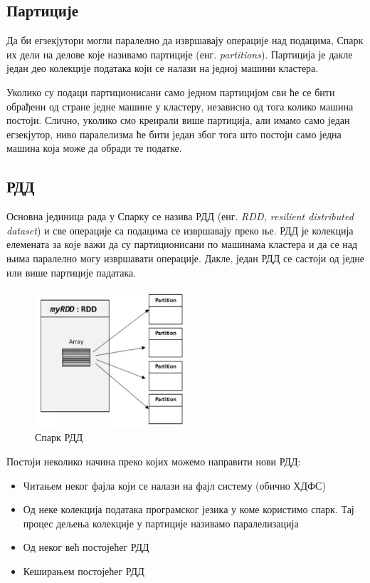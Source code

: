 \documentclass[12pt,oneside]{memoir}
\begin{document}
\subsection{Партиције}
\label{subsec:spark_partic}

Да би егзекјутори могли паралелно да извршавају операције над подацима, Спарк их дели на делове које називамо партиције (енг. \textit{partitions}). Партиција је дакле један део колекције података који се налази на једној машини кластера. \cite{spark_guide}

Уколико су подаци партиционисани само једном партицијом сви ће се бити обрађени од стране једне машине у кластеру, независно од тога колико машина постоји. Слично, уколико смо креирали више партиција, али имамо само један егзекјутор, ниво паралелизма ће бити један због тога што постоји само једна машина која може да обради те податке. \cite{spark_guide}

\subsection{РДД}
\label{subsec:spark_rdd}

Основна јединица рада у Спарку се назива РДД (енг. \textit{RDD, resilient distributed dataset}) и све операције са подацима се извршавају преко ње. РДД је колекција елемената за које важи да су партиционисани по машинама кластера и да се над њима паралелно могу извршавати операције. \cite{spark_rdd} Дакле, један РДД се састоји од једне или више партиције падатака. \cite{spark_guide}

\begin{figure}[!ht]
  \centering
  \includegraphics[width=0.5\textwidth]{pictures/spark_rdd.png}
  \caption{Спарк РДД}
  \label{fig:sprk_rdd}
\end{figure}

Постоји неколико начина преко којих можемо направити нови РДД:
\begin{itemize}
\item Читањем неког фајла који се налази на фајл систему (обично ХДФС)
\item Од неке колекција података програмског језика у коме користимо спарк. Тај процес дељења колекције у партиције називамо паралелизација
\item Од неког већ постојећег РДД
\item Кеширањем постојећег РДД
\end{itemize}
\end{document}
